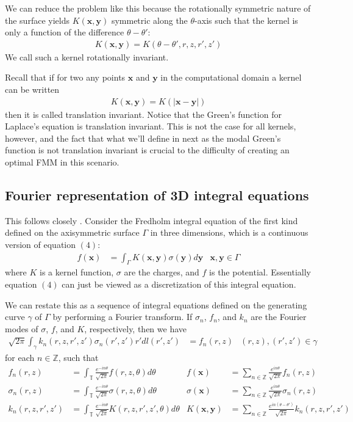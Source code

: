 \documentclass[11pt, oneside]{article}   	%
\begin{document}
We can reduce the problem like this because the rotationally symmetric nature of the surface yields $K(\mathbf{x},\mathbf{y})$ symmetric along the $\theta$-axis such that the kernel is only a function of the difference $\theta-\theta'$:
\begin{align}
K(\mathbf{x},\mathbf{y})=K(\theta-\theta',r,z,r',z')
\end{align}
We call such a kernel rotationally invariant.

Recall that if for two any points $\mathbf{x}$ and $\mathbf{y}$ in the computational domain a kernel can be written
\begin{align}
K(\mathbf{x},\mathbf{y}) = K(|\mathbf{x}-\mathbf{y}|)%
\end{align}
then it is called translation invariant. Notice that the Green's function for Laplace's equation is translation invariant. This is not the case for all kernels, however, and the fact that what we'll define in next as the modal Green's function is not translation invariant is crucial to the difficulty of creating an optimal FMM in this scenario.

\subsection{Fourier representation of 3D integral equations}
This follows closely \cite{YYM}.
Consider the Fredholm integral equation of the first kind defined on the axisymmetric surface $\Gamma$ in three dimensions, which is a continuous version of equation $(4)$:
\begin{align}
f(\mathbf{x}) &= \int_\Gamma K(\mathbf{x},\mathbf{y})\sigma(\mathbf{y})d\mathbf{y} &\mathbf{x},\mathbf{y}\in\Gamma
\end{align}
where $K$ is a kernel function, $\sigma$ are the charges, and $f$ is the potential. Essentially equation $(4)$ can just be viewed as a discretization of this integral equation.

We can restate this as a sequence of integral equations defined on the generating curve $\gamma$ of $\Gamma$ by performing a Fourier transform. If $\sigma_n$, $f_n$, and $k_n$ are the Fourier modes of $\sigma$, $f$, and $K$, respectively, then we have
\begin{align}
\sqrt{2\pi}\int_\gamma k_n(r,z,r',z')\sigma_n(r',z')r'dl(r',z')&=f_n(r,z) &(r,z),(r',z')\in\gamma
\end{align}
for each $n\in\mathbb{Z}$, such that
\begin{align}
f_n(r,z)&=\int_\mathbb{T}\frac{e^{-in\theta}}{\sqrt{2\pi}}f(r,z,\theta)d\theta&f(\mathbf{x})&=\sum_{n\in\mathbb{Z}}\frac{e^{in\theta}}{\sqrt{2\pi}}f_n(r,z)\\
\sigma_n(r,z)&=\int_\mathbb{T}\frac{e^{-in\theta}}{\sqrt{2\pi}}\sigma(r,z,\theta)d\theta&\sigma(\mathbf{x})&=\sum_{n\in\mathbb{Z}}\frac{e^{in\theta}}{\sqrt{2\pi}}\sigma_n(r,z)\\
k_n(r,z,r',z')&=\int_\mathbb{T}\frac{e^{-in\theta}}{\sqrt{2\pi}}K(r,z,r',z',\theta)d\theta&K(\mathbf{x},\mathbf{y})&=\sum_{n\in\mathbb{Z}}\frac{e^{in(\theta-\theta')}}{\sqrt{2\pi}}k_n(r,z,r',z')
\end{align}
\end{document}
